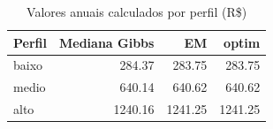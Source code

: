 \begin{table}

\caption{Valores anuais calculados por perfil (R\$)}
\centering
\begin{tabular}[t]{lrrr}
\toprule
Perfil & Mediana Gibbs & EM & optim\\
\midrule
baixo & 284.37 & 283.75 & 283.75\\
medio & 640.14 & 640.62 & 640.62\\
alto & 1240.16 & 1241.25 & 1241.25\\
\bottomrule
\end{tabular}
\end{table}
